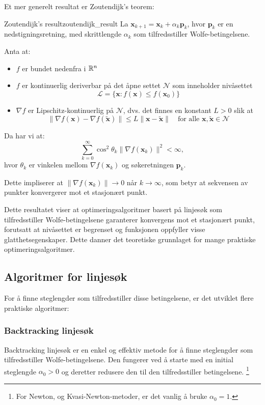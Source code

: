 Et mer generelt resultat er Zoutendijk's teorem:

\begin{theorem}{Zoutendijk's result}{zoutendijk_result}
	La \( \symbf{x}_{k+1} = \symbf{x}_k + \alpha_k \symbf{p}_k \), hvor \( \mathbf{p}_k \) er en nedstigningsretning, med skrittlengde \( \alpha_k \) som tilfredsstiller Wolfe-betingelsene.

	Anta at:
	\begin{itemize}
		\item \(f\) er bundet nedenfra i \(\mathbb{R}^n\)
		\item \(f\) er kontinuerlig deriverbar på det åpne settet \(\mathcal{N}\) som inneholder nivåsettet
		      \[ \mathcal{L} = \{\symbf{x}: f(\symbf{x}) \leq f(\symbf{x}_0)\} \]
		\item \(\nabla f\) er Lipschitz-kontinuerlig på \(\mathcal{N}\), dvs. det finnes en konstant \(L > 0\) slik at
		      \[ \|\nabla f(\symbf{x}) - \nabla f(\tilde{\symbf{x}})\| \leq L\|\symbf{x} - \tilde{\symbf{x}}\| \quad \text{for alle } \symbf{x}, \tilde{\symbf{x}} \in \mathcal{N} \]
	\end{itemize}

	Da har vi at:
	\[
		\sum_{k=0}^{\infty} \cos^2 \theta_k \| \nabla f(\symbf{x}_k) \|^2 < \infty,
	\]
	hvor \( \theta_k \) er vinkelen mellom \( \nabla f(\symbf{x}_k) \) og søkeretningen \( \symbf{p}_k \).

	Dette impliserer at \( \| \nabla f(\symbf{x}_k) \| \to 0 \) når \( k \to \infty \), som betyr at sekvensen av punkter konvergerer mot et stasjonært punkt.
\end{theorem}

Dette resultatet viser at optimeringsalgoritmer basert på linjesøk som tilfredsstiller Wolfe-betingelsene garanterer konvergens mot et stasjonært punkt, forutsatt at nivåsettet er begrenset og funksjonen oppfyller visse glatthetsegenskaper. Dette danner det teoretiske grunnlaget for mange praktiske optimeringsalgoritmer.

\subsection{Algoritmer for linjesøk}
\label{subsec:line_search_algorithms}

For å finne steglengder som tilfredsstiller disse betingelsene, er det utviklet flere praktiske algoritmer:

\subsubsection{Backtracking linjesøk}
\label{subsubsec:backtracking_line_search}
Backtracking linjesøk er en enkel og effektiv metode for å finne steglengder som tilfredsstiller Wolfe-betingelsene.
Den fungerer ved å starte med en initial steglengde \(\alpha_0 > 0\) og deretter redusere den til den tilfredsstiller betingelsene.
\footnote{For Newton, og Kvasi-Newton-metoder, er det vanlig å bruke \(\alpha_0 = 1\).}

